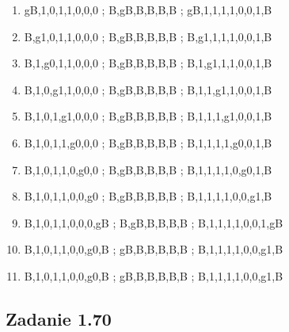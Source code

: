 \documentclass[leqno]{article}
\begin{document}
\begin{enumerate}
                    \item {}   {gB,1,0,1,1,0,0,0 ; B,gB,B,B,B,B ; gB,1,1,1,1,0,0,1,B}
                    \item {}     {B,g1,0,1,1,0,0,0 ; B,gB,B,B,B,B ; B,g1,1,1,1,0,0,1,B}
                    \item {}     {B,1,g0,1,1,0,0,0 ; B,gB,B,B,B,B ; B,1,g1,1,1,0,0,1,B}
                    \item {}     {B,1,0,g1,1,0,0,0 ; B,gB,B,B,B,B ; B,1,1,g1,1,0,0,1,B}
                    \item {}     {B,1,0,1,g1,0,0,0 ; B,gB,B,B,B,B ; B,1,1,1,g1,0,0,1,B}
                    \item {}     {B,1,0,1,1,g0,0,0 ; B,gB,B,B,B,B ; B,1,1,1,1,g0,0,1,B}
                    \item {}     {B,1,0,1,1,0,g0,0 ; B,gB,B,B,B,B ; B,1,1,1,1,0,g0,1,B}
                    \item {}     {B,1,0,1,1,0,0,g0 ; B,gB,B,B,B,B ; B,1,1,1,1,0,0,g1,B}
                    \item {}   {B,1,0,1,1,0,0,0,gB ; B,gB,B,B,B,B ; B,1,1,1,1,0,0,1,gB}
                    \item {}     {B,1,0,1,1,0,0,g0,B ; gB,B,B,B,B,B ; B,1,1,1,1,0,0,g1,B}
                    \item {}     {B,1,0,1,1,0,0,g0,B ; gB,B,B,B,B,B ; B,1,1,1,1,0,0,g1,B}
                \end{enumerate}
    \newpage
        \subsection{Zadanie 1.70}
\end{document}
